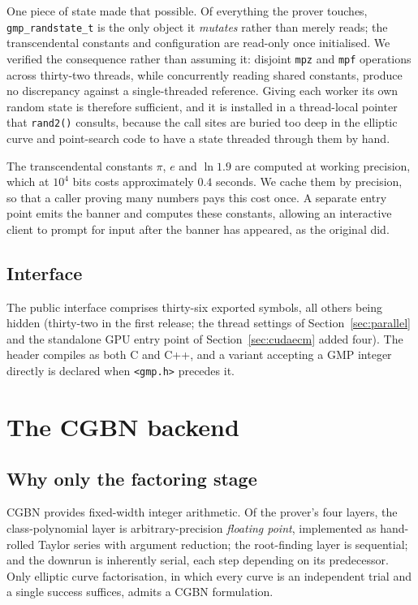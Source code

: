 \documentclass[11pt,a4paper]{article}
\newcommand{\code}[1]{\texttt{#1}}
\begin{document}
One piece of state made that possible. Of everything the prover touches,
\code{gmp\_randstate\_t} is the only object it \emph{mutates} rather than
merely reads; the transcendental constants and configuration are
read-only once initialised. We verified the consequence rather than
assuming it: disjoint \code{mpz} and \code{mpf} operations across
thirty-two threads, while concurrently reading shared constants, produce
no discrepancy against a single-threaded reference. Giving each worker
its own random state is therefore sufficient, and it is installed in a
thread-local pointer that \code{rand2()} consults, because the call sites
are buried too deep in the elliptic curve and point-search code to have a
state threaded through them by hand.

The transcendental constants $\pi$, $e$ and $\ln 1.9$ are computed at
working precision, which at $10^4$ bits costs approximately $0.4$
seconds. We cache them by precision, so that a caller proving many
numbers pays this cost once. A separate entry point emits the banner and
computes these constants, allowing an interactive client to prompt for
input after the banner has appeared, as the original did.

\subsection{Interface}

The public interface comprises thirty-six exported symbols, all others
being hidden (thirty-two in the first release; the thread settings of
Section~\ref{sec:parallel} and the standalone GPU entry point of
Section~\ref{sec:cudaecm} added four). The header compiles as both C and C++, and a variant
accepting a GMP integer directly is declared when \code{<gmp.h>} precedes
it.

\section{The CGBN backend}

\subsection{Why only the factoring stage}

CGBN provides fixed-width integer arithmetic. Of the prover's four
layers, the class-polynomial layer is arbitrary-precision \emph{floating
point}, implemented as hand-rolled Taylor series with argument reduction;
the root-finding layer is sequential; and the downrun is inherently
serial, each step depending on its predecessor. Only elliptic curve
factorisation, in which every curve is an independent trial and a single
success suffices, admits a CGBN formulation.
\end{document}
